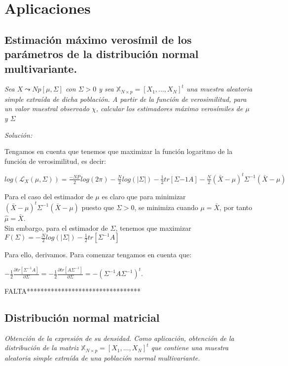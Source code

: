 \documentclass{article}
\theoremstyle{theorem-style}  %
\theoremstyle{definition-style}
\theoremstyle{example-style}
\theoremstyle{exercise-style}
\begin{document}
	\section{Aplicaciones}
	
	\subsection{Estimación máximo verosímil de los parámetros de la distribución normal multivariante.}
	
	\textit{Sea $X \leadsto Np[\mu, \Sigma]$ con $\Sigma > 0$ y sea $\mathbb{X}_{N \times p} = [X_1, ..., X_N]^t$ una muestra aleatoria simple extraída de dicha población. A partir de la función de verosimilitud, para un valor muestral observado $\chi$, calcular los estimadores máximo verosímiles de $\mu$ y $\Sigma$}
	
	\textit{Solución: }
	
	Tengamos en cuenta que tenemos que maximizar la función logaritmo de la función de verosimilitud, es decir:
	
	$log(\mathcal{L}_X(\mu, \Sigma))=\frac{-NP}{2}log(2\pi)- \frac{N}{2}log(|\Sigma|) - \frac{1}{2}tr[\Sigma{-1}A] - \frac{N}{2}(\bar{X}-\mu)^t\Sigma^{-1}(\bar{X}-\mu)$
	
	Para el caso del estimador de $\mu$ es claro que para minimizar $(\bar{X}-\mu)^t\Sigma^{-1}(\bar{X}-\mu)$ puesto que $\Sigma>0$, se minimiza cuando $\mu = \bar{X}$, por tanto $ \hat{\mu} = \bar{X}$.\\
	
	Sin embargo, para el estimador de $\Sigma$, tenemos que maximizar $F(\Sigma) = -\frac{N}{2}log(|\Sigma|) - \frac{1}{2}tr[\Sigma^{-1}A]$
	
	Para ello, derivamos. Para comenzar tengamos en cuenta que:
	
	$-\frac{1}{2}\frac{\partial tr[\Sigma^{-1}A]}{\partial \Sigma}=-\frac{1}{2}\frac{\partial tr[A\Sigma^{-1}]}{\partial \Sigma}  = -(\Sigma^{-1}A\Sigma^{-1})^t.$
	
	
	FALTA*********************************
	
	\subsection{Distribución normal matricial}
	
	\textit{Obtención de la expresión de su densidad. Como aplicación, obtención de la distribución de la matriz $\mathbb{X}_{N \times p} = [X_1, ..., X_N]^t$ que contiene una muestra aleatoria simple extraída de una población normal multivariante.}
	
\end{document}
